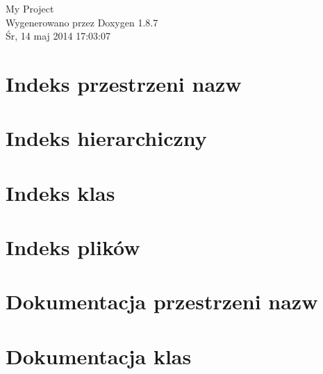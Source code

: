 \documentclass[twoside]{book}
\newcommand{\+}{\discretionary{\mbox{\scriptsize$\hookleftarrow$}}{}{}}
\newcommand{\clearemptydoublepage}{%
  \newpage{\pagestyle{empty}\cleardoublepage}%
}
\begin{document}
\hypersetup{pageanchor=false,
             bookmarks=true,
             bookmarksnumbered=true,
             pdfencoding=unicode
            }
\begin{titlepage}
\vspace*{7cm}
\begin{center}%
{\Large My Project }\\
\vspace*{1cm}
{\large Wygenerowano przez Doxygen 1.8.7}\\
\vspace*{0.5cm}
{\small Śr, 14 maj 2014 17:03:07}\\
\end{center}
\end{titlepage}
\clearemptydoublepage
\tableofcontents
\clearemptydoublepage
{}
\hypersetup{pageanchor=true}

\chapter{Indeks przestrzeni nazw}

\chapter{Indeks hierarchiczny}

\chapter{Indeks klas}

\chapter{Indeks plików}

\chapter{Dokumentacja przestrzeni nazw}

\chapter{Dokumentacja klas}


















\end{document}
